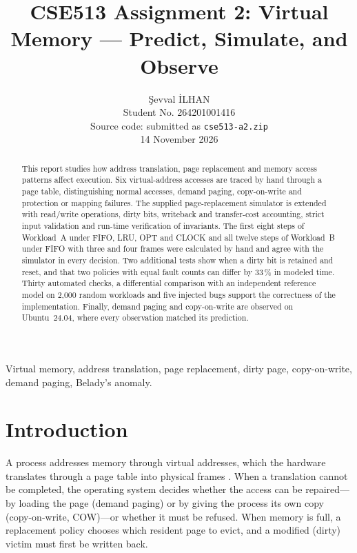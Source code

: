 \documentclass[conference,a4paper]{IEEEtran}
\newcommand{\code}[1]{\texttt{#1}}
\begin{document}
\title{CSE513 Assignment 2: Virtual Memory --- Predict, Simulate, and Observe}
\author{Şevval İLHAN\\[2pt]
\normalsize Student No. 264201001416\\
Source code: submitted as \code{cse513-a2.zip}\\
14 November 2026}
\maketitle

\begin{abstract}
This report studies how address translation, page replacement and memory access patterns affect execution. Six virtual-address accesses are traced by hand through a page table, distinguishing normal accesses, demand paging, copy-on-write and protection or mapping failures. The supplied page-replacement simulator is extended with read/write operations, dirty bits, writeback and transfer-cost accounting, strict input validation and run-time verification of invariants. The first eight steps of Workload~A under FIFO, LRU, OPT and CLOCK and all twelve steps of Workload~B under FIFO with three and four frames were calculated by hand and agree with the simulator in every decision. Two additional tests show when a dirty bit is retained and reset, and that two policies with equal fault counts can differ by 33\,\% in modeled time. Thirty automated checks, a differential comparison with an independent reference model on 2{,}000 random workloads and five injected bugs support the correctness of the implementation. Finally, demand paging and copy-on-write are observed on Ubuntu~24.04, where every observation matched its prediction.
\end{abstract}

\begin{IEEEkeywords}
Virtual memory, address translation, page replacement, dirty page, copy-on-write, demand paging, Belady's anomaly.
\end{IEEEkeywords}

\section{Introduction}
A process addresses memory through virtual addresses, which the hardware translates through a page table into physical frames \cite{silberschatz}. When a translation cannot be completed, the operating system decides whether the access can be repaired---by loading the page (demand paging) or by giving the process its own copy (copy-on-write, COW)---or whether it must be refused. When memory is full, a replacement policy chooses which resident page to evict, and a modified (dirty) victim must first be written back.
\end{document}
